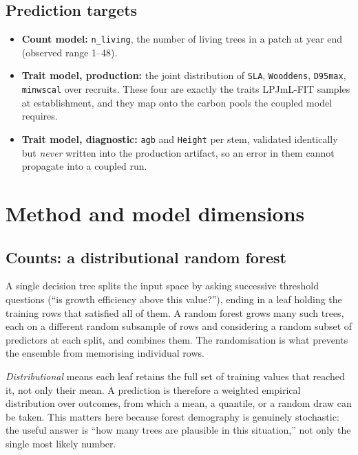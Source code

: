 \documentclass[11pt]{article}
\begin{document}
\subsection{Prediction targets}

\begin{itemize}[leftmargin=1.4em]
\item \textbf{Count model:} \texttt{n\_living}, the number of living trees in a patch at year end (observed range 1--48).
\item \textbf{Trait model, production:} the joint distribution of \texttt{SLA}, \texttt{Wooddens}, \texttt{D95max}, \texttt{minwscal} over recruits. These four are exactly the traits LPJmL-FIT samples at establishment, and they map onto the carbon pools the coupled model requires.
\item \textbf{Trait model, diagnostic:} \texttt{agb} and \texttt{Height} per stem, validated identically but \emph{never} written into the production artifact, so an error in them cannot propagate into a coupled run.
\end{itemize}

\section{Method and model dimensions}
\label{sec:method}

\subsection{Counts: a distributional random forest}

A single decision tree splits the input space by asking successive threshold questions (``is growth efficiency above this value?''), ending in a leaf holding the training rows that satisfied all of them. A random forest grows many such trees, each on a different random subsample of rows and considering a random subset of predictors at each split, and combines them. The randomisation is what prevents the ensemble from memorising individual rows.

\emph{Distributional} means each leaf retains the full set of training values that reached it, not only their mean. A prediction is therefore a weighted empirical distribution over outcomes, from which a mean, a quantile, or a random draw can be taken. This matters here because forest demography is genuinely stochastic: the useful answer is ``how many trees are plausible in this situation,'' not only the single most likely number.
\end{document}
